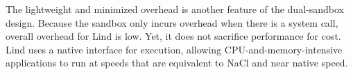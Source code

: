 The lightweight and minimized overhead is another feature of the dual-sandbox design. Because the sandbox only
 incurs overhead when there is a system call, overall overhead for Lind is low.
 Yet, it does not sacrifice performance for cost.
Lind uses a native interface for execution,
allowing CPU-and-memory-intensive applications to run at speeds that are equivalent
 to NaCl and near native speed.
